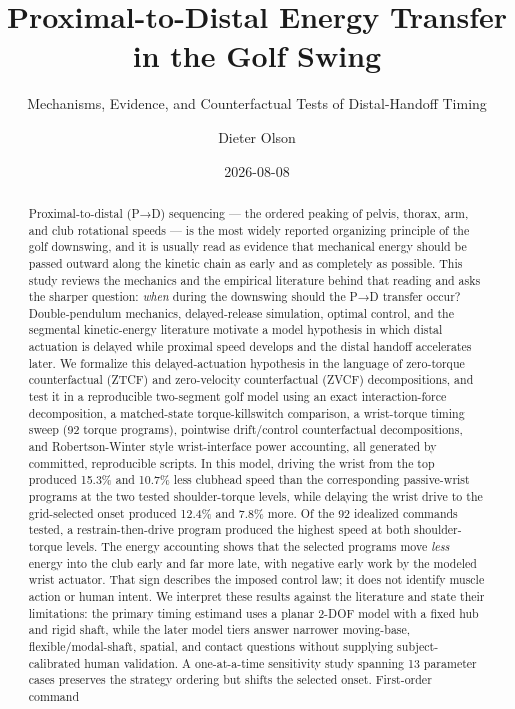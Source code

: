 \documentclass[
  letterpaper,
]{report}
\title{Proximal-to-Distal Energy Transfer in the Golf Swing}
\subtitle{Mechanisms, Evidence, and Counterfactual Tests of
Distal-Handoff Timing}
\author{Dieter Olson}
\date{2026-08-08}
\begin{document}
\maketitle
\begin{abstract}
Proximal-to-distal (P→D) sequencing --- the ordered peaking of pelvis,
thorax, arm, and club rotational speeds --- is the most widely reported
organizing principle of the golf downswing, and it is usually read as
evidence that mechanical energy should be passed outward along the
kinetic chain as early and as completely as possible. This study reviews
the mechanics and the empirical literature behind that reading and asks
the sharper question: \emph{when} during the downswing should the P→D
transfer occur? Double-pendulum mechanics, delayed-release simulation,
optimal control, and the segmental kinetic-energy literature motivate a
model hypothesis in which distal actuation is delayed while proximal
speed develops and the distal handoff accelerates later. We formalize
this delayed-actuation hypothesis in the language of zero-torque
counterfactual (ZTCF) and zero-velocity counterfactual (ZVCF)
decompositions, and test it in a reproducible two-segment golf model
using an exact interaction-force decomposition, a matched-state
torque-killswitch comparison, a wrist-torque timing sweep (92 torque
programs), pointwise drift/control counterfactual decompositions, and
Robertson-Winter style wrist-interface power accounting, all generated
by committed, reproducible scripts. In this model, driving the wrist
from the top produced 15.3\% and 10.7\% less clubhead speed than the
corresponding passive-wrist programs at the two tested shoulder-torque
levels, while delaying the wrist drive to the grid-selected onset
produced 12.4\% and 7.8\% more. Of the 92 idealized commands tested, a
restrain-then-drive program produced the highest speed at both
shoulder-torque levels. The energy accounting shows that the selected
programs move \emph{less} energy into the club early and far more late,
with negative early work by the modeled wrist actuator. That sign
describes the imposed control law; it does not identify muscle action or
human intent. We interpret these results against the literature and
state their limitations: the primary timing estimand uses a planar 2-DOF
model with a fixed hub and rigid shaft, while the later model tiers
answer narrower moving-base, flexible/modal-shaft, spatial, and contact
questions without supplying subject-calibrated human validation. A
one-at-a-time sensitivity study spanning 13 parameter cases preserves
the strategy ordering but shifts the selected onset. First-order command

\end{abstract}
\end{document}

